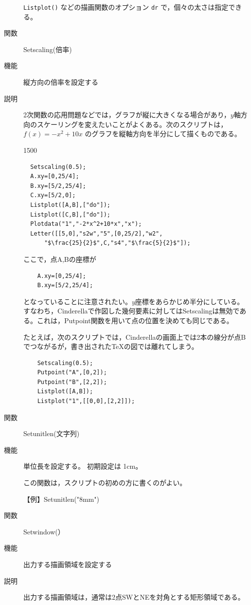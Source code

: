 \documentclass[papersize,a4paper,12pt,uplatex]{jsarticle}
\begin{document}
\begin{description}
\verb|Listplot()| などの描画関数のオプション \verb|dr| で，個々の太さは指定できる。

\vspace{\baselineskip}
\hypertarget{setscaling}{}
\item[関数]  Setscaling(倍率)
\item[機能]  縦方向の倍率を設定する
\item[説明]  2次関数の応用問題などでは，グラフが縦に大きくなる場合があり，$y$軸方向のスケーリングを変えたいことがよくある。次のスクリプトは，$f(x)=-x^2+10x$ のグラフを縦軸方向を半分にして描くものである。

\begin{layer}{150}{0}
\end{layer}
\begin{verbatim}
  Setscaling(0.5);
  A.xy=[0,25/4];
  B.xy=[5/2,25/4];
  C.xy=[5/2,0];
  Listplot([A,B],["do"]);
  Listplot([C,B],["do"]);
  Plotdata("1","-2*x^2+10*x","x");
  Letter([[5,0],"s2w","5",[0,25/2],"w2",
      "$\frac{25}{2}$",C,"s4","$\frac{5}{2}$"]);
\end{verbatim}
  ここで，点A,Bの座標が
\begin{verbatim}
    A.xy=[0,25/4];
    B.xy=[5/2,25/4];
\end{verbatim}
となっていることに注意されたい。$y$座標をあらかじめ半分にしている。すなわち，Cinderellaで作図した幾何要素に対してはSetscalingは無効である。これは，Putpoint関数を用いて点の位置を決めても同じである。

たとえば，次のスクリプトでは，Cinderellaの画面上では2本の線分が点Bでつながるが，書き出された\TeX の図では離れてしまう。
\begin{verbatim}
    Setscaling(0.5);
    Putpoint("A",[0,2]);
    Putpoint("B",[2,2]);
    Listplot([A,B]);
    Listplot("1",[[0,0],[2,2]]);
\end{verbatim}

\hypertarget{setunitlen}{}
\item[関数]  Setunitlen(文字列)
\item[機能]  単位長を設定する。 初期設定は 1cm。

この関数は，スクリプトの初めの方に書くのがよい。
  
【例】Setunitlen("8mm")
  
\vspace{\baselineskip}
\hypertarget{setwindow}{}
\item[関数]  Setwindow(）
\item[機能]  出力する描画領域を設定する
\item[説明]  出力する描画領域は，通常は2点SWとNEを対角とする矩形領域である。


\end{description}
\end{document}
